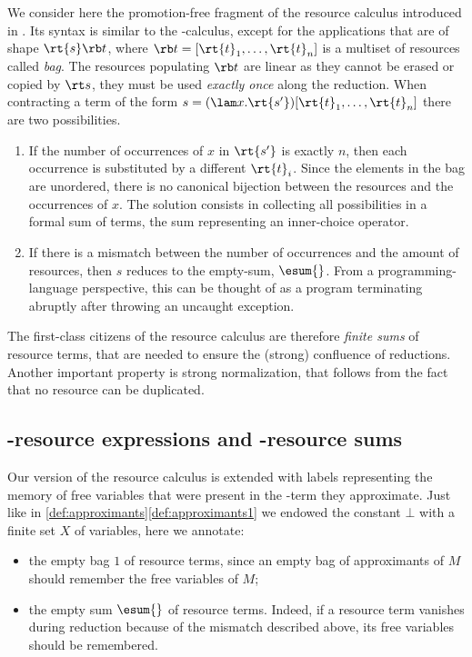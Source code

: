 \documentclass[10pt,a4paper]{amsart}
\theoremstyle{definition}
\begin{document}
We consider here the promotion-free fragment of the resource calculus introduced in \cite{PaganiT09}.
Its syntax is similar to the \lam-calculus, except for the applications that are of shape $\rt{s}\rb t$, where $\rb t = [\rt{t}_1,\dots,\rt{t}_n]$ is a multiset of resources called \emph{bag}.
The resources populating $\rb t$ are linear as they cannot be erased or copied by $\rt s$, they must be used \emph{exactly once} along the reduction. 
When contracting a term of the form $s = (\lam x.\rt{s'})[\rt{t}_1,\dots,\rt{t}_n]$ there are two possibilities.
\begin{enumerate}
\item If the number of occurrences of $x$ in $\rt{s'}$ is exactly $n$, then each occurrence is substituted by a different $\rt{t}_i$. 
Since the elements in the bag are unordered, there is no canonical bijection between the resources and the occurrences of $x$. 
The solution consists in collecting all possibilities in a formal sum of terms, the sum representing an inner-choice operator.
\item If there is a mismatch between the number of occurrences and the amount of resources, then $s$ reduces to the empty-sum, $\esum{}$. From a programming-language perspective, this can be thought of as a program terminating abruptly after throwing an uncaught exception.
\end{enumerate}
The first-class citizens of the resource calculus are therefore \emph{finite sums} of resource terms, that are needed to ensure the (strong) confluence of reductions. Another important property is strong normalization, that follows from the fact that no resource can be duplicated.

\subsection{\lamI-resource expressions and \lamI-resource sums}

Our version of the resource calculus is extended with labels representing the memory of free variables that were present in the \lamI-term they approximate.
Just like in \cref{def:approximants}\eqref{def:approximants1} 
we endowed the constant $\bot$ with a finite set $X$ of variables, 
here we annotate:
\begin{itemize}
\item the empty bag $1$ of resource terms, since an empty bag of approximants of $M$ should remember the free variables of $M$;
\item the empty sum $\esum{}$ of resource terms. Indeed, if a resource term vanishes during reduction because of the mismatch described above, its free variables should be remembered.
\end{itemize}
\end{document}
